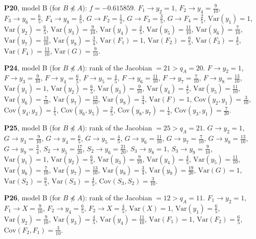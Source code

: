 \documentclass[10pt,a4paper]{article}
\newcommand{\nnest}{\not\preceq}
\begin{document}
{\noindent\textbf{P20}, model B (for $B\nnest A$): $f=-0.615859$. {\footnotesize $F_{1}\to y_{2}=1$, $F_{2}\to y_{4}=\tfrac{9}{10}$, $F_{3}\to y_{6}=\tfrac{6}{5}$, $F_{4}\to y_{8}=\tfrac{4}{5}$, $G\to F_{2}=\tfrac{1}{2}$, $G\to F_{3}=\tfrac{3}{5}$, $G\to F_{4}=\tfrac{2}{5}$, $\mathrm{Var}(y_{1})=1$, $\mathrm{Var}(y_{2})=\tfrac{6}{5}$, $\mathrm{Var}(y_{3})=\tfrac{9}{10}$, $\mathrm{Var}(y_{4})=\tfrac{4}{5}$, $\mathrm{Var}(y_{5})=\tfrac{11}{10}$, $\mathrm{Var}(y_{6})=\tfrac{7}{10}$, $\mathrm{Var}(y_{7})=\tfrac{13}{10}$, $\mathrm{Var}(y_{8})=\tfrac{3}{4}$, $\mathrm{Var}(F_{1})=1$, $\mathrm{Var}(F_{2})=\tfrac{6}{5}$, $\mathrm{Var}(F_{3})=\tfrac{4}{5}$, $\mathrm{Var}(F_{4})=\tfrac{11}{10}$, $\mathrm{Var}(G)=\tfrac{9}{10}$.}\par\smallskip
\noindent\textbf{P24}, model B (for $B\nnest A$): rank of the Jacobian $=21>q_A=20$. {\footnotesize $F\to y_{2}=1$, $F\to y_{3}=\tfrac{9}{10}$, $F\to y_{4}=\tfrac{6}{5}$, $F\to y_{5}=\tfrac{4}{5}$, $F\to y_{6}=\tfrac{11}{10}$, $F\to y_{7}=\tfrac{7}{10}$, $F\to y_{8}=\tfrac{13}{10}$, $\mathrm{Var}(y_{1})=1$, $\mathrm{Var}(y_{2})=\tfrac{6}{5}$, $\mathrm{Var}(y_{3})=\tfrac{9}{10}$, $\mathrm{Var}(y_{4})=\tfrac{4}{5}$, $\mathrm{Var}(y_{5})=\tfrac{11}{10}$, $\mathrm{Var}(y_{6})=\tfrac{7}{10}$, $\mathrm{Var}(y_{7})=\tfrac{13}{10}$, $\mathrm{Var}(y_{8})=\tfrac{3}{4}$, $\mathrm{Var}(F)=1$, $\mathrm{Cov}(y_{2},y_{1})=\tfrac{3}{10}$, $\mathrm{Cov}(y_{4},y_{3})=\tfrac{1}{5}$, $\mathrm{Cov}(y_{6},y_{5})=\tfrac{2}{5}$, $\mathrm{Cov}(y_{8},y_{7})=\tfrac{1}{4}$, $\mathrm{Cov}(y_{3},y_{1})=\tfrac{7}{20}$.}\par\smallskip
\noindent\textbf{P25}, model B (for $B\nnest A$): rank of the Jacobian $=25>q_A=21$. {\footnotesize $G\to y_{2}=1$, $G\to y_{3}=\tfrac{9}{10}$, $G\to y_{4}=\tfrac{6}{5}$, $G\to y_{5}=\tfrac{4}{5}$, $G\to y_{6}=\tfrac{11}{10}$, $G\to y_{7}=\tfrac{7}{10}$, $G\to y_{8}=\tfrac{13}{10}$, $G\to y_{9}=\tfrac{3}{4}$, $S_{2}\to y_{5}=\tfrac{17}{20}$, $S_{2}\to y_{6}=\tfrac{21}{20}$, $S_{3}\to y_{8}=1$, $S_{3}\to y_{9}=\tfrac{9}{10}$, $\mathrm{Var}(y_{1})=1$, $\mathrm{Var}(y_{2})=\tfrac{6}{5}$, $\mathrm{Var}(y_{3})=\tfrac{9}{10}$, $\mathrm{Var}(y_{4})=\tfrac{4}{5}$, $\mathrm{Var}(y_{5})=\tfrac{11}{10}$, $\mathrm{Var}(y_{6})=\tfrac{7}{10}$, $\mathrm{Var}(y_{7})=\tfrac{13}{10}$, $\mathrm{Var}(y_{8})=\tfrac{3}{4}$, $\mathrm{Var}(y_{9})=\tfrac{19}{20}$, $\mathrm{Var}(G)=1$, $\mathrm{Var}(S_{2})=\tfrac{6}{5}$, $\mathrm{Var}(S_{3})=\tfrac{4}{5}$, $\mathrm{Cov}(S_{3},S_{2})=\tfrac{3}{10}$.}\par\smallskip
\noindent\textbf{P26}, model B (for $B\nnest A$): rank of the Jacobian $=12>q_A=11$. {\footnotesize $F_{1}\to y_{2}=1$, $F_{1}\to X=\tfrac{9}{10}$, $F_{2}\to y_{4}=\tfrac{6}{5}$, $F_{2}\to X=\tfrac{4}{5}$, $\mathrm{Var}(X)=1$, $\mathrm{Var}(y_{1})=\tfrac{6}{5}$, $\mathrm{Var}(y_{2})=\tfrac{9}{10}$, $\mathrm{Var}(y_{3})=\tfrac{4}{5}$, $\mathrm{Var}(y_{4})=\tfrac{11}{10}$, $\mathrm{Var}(F_{1})=1$, $\mathrm{Var}(F_{2})=\tfrac{6}{5}$, $\mathrm{Cov}(F_{2},F_{1})=\tfrac{3}{10}$.}\par\smallskip
}
\end{document}
